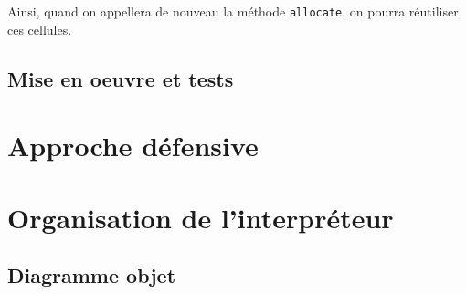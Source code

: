 \documentclass[12pt]{article}
\def\code #1{\lstinline{#1}}
\begin{document}
Ainsi, quand on appellera de nouveau la méthode \code{allocate}, on pourra réutiliser ces cellules.


\subsection{Mise en oeuvre et tests}

\section{Approche défensive}

\section{Organisation de l'interpréteur}

\subsection{Diagramme objet}
\end{document}
